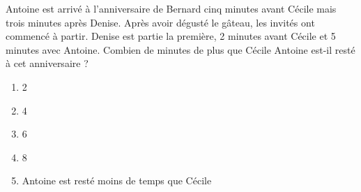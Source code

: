 Antoine est arrivé à l'anniversaire de Bernard cinq minutes avant Cécile mais trois minutes après Denise. Après avoir dégusté le gâteau, les invités ont commencé à partir. Denise est partie la première, 2 minutes avant Cécile et 5 minutes avec Antoine. Combien de minutes de plus que Cécile Antoine est-il resté à cet anniversaire ?
\begin{multicols}{3}
  \begin{enumerate}[A/]
  \item 2
  \item 4
  \item 6
  \item 8
  \item Antoine est resté moins de temps que Cécile
  \end{enumerate}
\end{multicols}